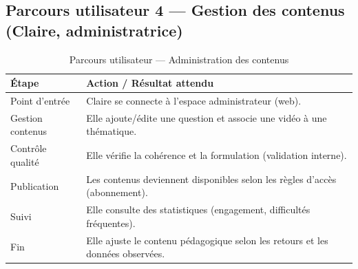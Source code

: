 \subsection{Parcours utilisateur 4 — Gestion des contenus (Claire, administratrice)}

\begin{table}[h!]
\centering
\renewcommand{\arraystretch}{1.15}
\small
\begin{tabular}{|p{3.2cm}|p{10.4cm}|}
\hline
\rowcolor{black!10}
\textbf{Étape} & \textbf{Action / Résultat attendu} \\ \hline
Point d’entrée & Claire se connecte à l’espace administrateur (web). \\ \hline
Gestion contenus & Elle ajoute/édite une question et associe une vidéo à une thématique. \\ \hline
Contrôle qualité & Elle vérifie la cohérence et la formulation (validation interne). \\ \hline
Publication & Les contenus deviennent disponibles selon les règles d’accès (abonnement). \\ \hline
Suivi & Elle consulte des statistiques (engagement, difficultés fréquentes). \\ \hline
Fin & Elle ajuste le contenu pédagogique selon les retours et les données observées. \\ \hline
\end{tabular}
\caption{Parcours utilisateur — Administration des contenus}
\end{table}

